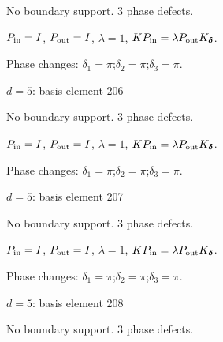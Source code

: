 No boundary support. 3 phase defects.
\begin{center}
\end{center}
\vspace{-1mm}
$P_{\rm in}=I$, \quad $P_{\rm out}=I$, \quad $\lambda=1$, \qquad $K P_{\rm in}=\lambda P_{\rm out}K_{\boldsymbol\delta}$.
\par\smallskip\begin{minipage}{.98\linewidth}\small Phase changes: $\delta_{1}=\pi$;\quad $\delta_{2}=\pi$;\quad $\delta_{3}=\pi$.\end{minipage}
\vfill
{\footnotesize\texttt{}}
\newpage
{}
{\Large $d=5$: basis element 206}\par
No boundary support. 3 phase defects.
\begin{center}
\end{center}
\vspace{-1mm}
$P_{\rm in}=I$, \quad $P_{\rm out}=I$, \quad $\lambda=1$, \qquad $K P_{\rm in}=\lambda P_{\rm out}K_{\boldsymbol\delta}$.
\par\smallskip\begin{minipage}{.98\linewidth}\small Phase changes: $\delta_{1}=\pi$;\quad $\delta_{2}=\pi$;\quad $\delta_{3}=\pi$.\end{minipage}
\vfill
{\footnotesize\texttt{}}
\newpage
{}
{\Large $d=5$: basis element 207}\par
No boundary support. 3 phase defects.
\begin{center}
\end{center}
\vspace{-1mm}
$P_{\rm in}=I$, \quad $P_{\rm out}=I$, \quad $\lambda=1$, \qquad $K P_{\rm in}=\lambda P_{\rm out}K_{\boldsymbol\delta}$.
\par\smallskip\begin{minipage}{.98\linewidth}\small Phase changes: $\delta_{1}=\pi$;\quad $\delta_{2}=\pi$;\quad $\delta_{3}=\pi$.\end{minipage}
\vfill
{\footnotesize\texttt{}}
\newpage
{}
{\Large $d=5$: basis element 208}\par
No boundary support. 3 phase defects.
\begin{center}
\end{center}
